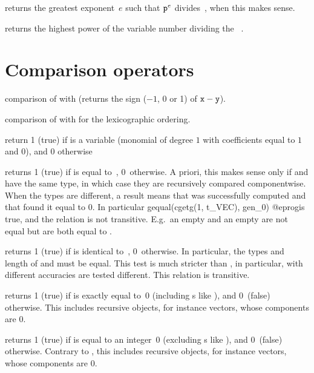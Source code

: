  returns the greatest exponent~$e$ such that
${\tt p}^e$ divides~, when this makes sense.

 returns the highest power of the variable
number  dividing the ~.

\section{Comparison operators}


 comparison of  with  (returns
the sign ($-1$, 0 or 1) of ${\tt x}-{\tt y}$).

 comparison of  with  for the
lexicographic ordering.

 return 1 (true) if  is a variable
(monomial of degree $1$ with  coefficients equal to $1$ and $0$),
and $0$ otherwise

 returns 1 (true) if  is equal
to~, 0~otherwise. A priori, this makes sense only if  and
 have the same type, in which case they are recursively compared
componentwise. When the types are different, a  result
means that  was successfully computed and that
 found it equal to $0$. In particular
\bprog
  gequal(cgetg(1, t_VEC), gen_0)
@eprog\noindent is true, and the relation is not transitive. E.g.~an empty
 and an empty  are not equal but are both equal to
.

 returns 1 (true) if  is identical
to~, 0~otherwise. In particular, the types and length of  and
 must be equal. This test is much stricter than , in
particular,  with different accuracies are tested different. This
relation is transitive.


 returns 1 (true) if  is exactly equal
to~0 (including s like ), and 0~(false) otherwise.
This includes recursive objects, for instance vectors, whose components are $0$.

 returns 1 (true) if  is equal
to an integer~0 (excluding s like ), and 0~(false)
otherwise. Contrary to , this includes recursive objects, for
instance vectors, whose components are $0$.

